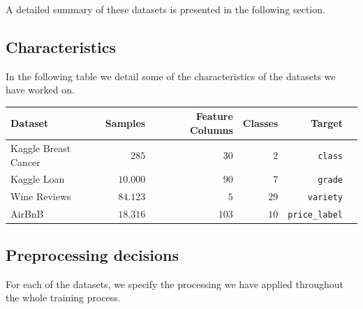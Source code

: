 \documentclass[12pt,a4paper]{article}
\begin{document}
A detailed summary of these datasets is presented in the following section.

\vspace{0.5cm}

\subsection{Characteristics}
In the following table we detail some of the characteristics of the datasets we have worked on.

\begin{table}[h]
\centering
\label{tab:Data_summary}
\begin{tabular}{lrrrrr}
    \toprule
        Dataset & Samples & Feature Columns & Classes & Target \\
        \midrule
        Kaggle Breast Cancer & $285$ & $30$ & $2$ & \texttt{class} \\
        Kaggle Loan & $10.000$ & $90$ & $7$ & \texttt{grade} \\
        Wine Reviews & $84.123$ & $5$ & $29$ & \texttt{variety} \\
        AirBnB & $18.316$ & $103$ & $10$ & \texttt{price\_label} \\
        \bottomrule
    \end{tabular}
\end{table}

\subsection{Preprocessing decisions}
For each of the datasets, we specify the processing we have applied throughout the whole training process.
\end{document}
